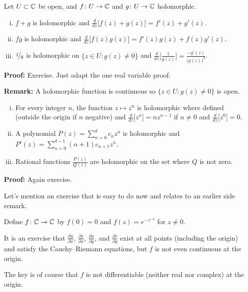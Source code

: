 \documentclass[10pt,aspectratio=169]{beamer}
\begin{document}
\begin{frame}
\begin{proposition}
Let $U \subset {\mathbb{C}}$ be open, and $f \colon U \to {\mathbb{C}}$ and
$g \colon U \to {\mathbb{C}}$ holomorphic.
\pause
\begin{enumerate}[(i)]
\item
$f+g$ is holomorphic and $\frac{d}{dz}\bigl[ f(z)+g(z) \bigr] = f'(z) + g'(z)$.
\pause
\item
$fg$ is holomorphic and $\frac{d}{dz}\bigl[f(z) g(z) \bigr] = f'(z)g(z) + f(z)g'(z)$.
\pause
\item
$\nicefrac{1}{g}$ is holomorphic on $\bigl\{ z \in U : g(z) \not= 0 \bigr\}$ and
$\frac{d}{dz}\bigl[\frac{1}{g(z)}\bigr] = \frac{-g'(z)}{{\bigl(g(z)\bigr)}^2}$.
\end{enumerate}
\end{proposition}

\medskip
\pause

\textbf{Proof:} Exercise.  Just adapt the one real variable proof.

\medskip
\pause

\textbf{Remark:} A holomorphic function is continuous so
$\bigl\{ z \in U : g(z) \not= 0 \bigr\}$ is open.
\end{frame}

\begin{frame}
\begin{proposition}
\begin{enumerate}[(i)]
\item
\pause
For every integer $n$, the function $z \mapsto z^n$ is holomorphic
where defined (outside the origin if $n$ negative) and
$\frac{d}{dz}\bigl[ z^n \bigr] = n z^{n-1}$
if $n\not=0$ and $\frac{d}{dz}\bigl[ z^0 \bigr] = 0$.
\item
\pause
A polynomial $P(z) = \sum_{n=0}^d c_n z^n$ is
holomorphic and
$P'(z) = \sum_{n=0}^{d-1} (n+1) c_{n+1} z^n$.
\item
\pause
Rational functions $\frac{P(z)}{Q(z)}$
are holomorphic on the set where $Q$ is not zero.
\end{enumerate}
\end{proposition}

\pause

\textbf{Proof:} Again exercise.
\end{frame}

\begin{frame}
Let's mention
an exercise that is easy to do now and relates to an earlier side remark.

\medskip
\pause

Define $f \colon {\mathbb{C}} \to {\mathbb{C}}$ by $f(0)=0$ and
$f(z) = e^{-z^{-4}}$ for $z \not=0$.

\medskip
\pause

It is an exercise that
$\frac{\partial u}{\partial x}$,
$\frac{\partial v}{\partial x}$,
$\frac{\partial u}{\partial y}$, and
$\frac{\partial v}{\partial y}$ exist at all points (including
the origin) and satisfy the Cauchy--Riemann equations,
but $f$ is not even continuous at the origin.

\medskip
\pause

The key is of course that $f$ is not differentiable (neither real nor complex)
at the origin.
\end{frame}
\end{document}
